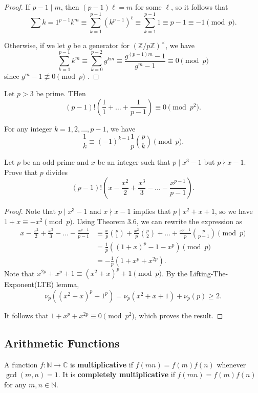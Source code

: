 \documentclass[11pt]{article}
\newcommand{\N}{\mathbb{N}}
\newcommand{\Z}{\mathbb{Z}}
\newcommand{\C}{\mathbb C}
\renewcommand{\>}{\rangle}
\newcommand{\<}{\langle}
\begin{document}
\begin{proof}
If $p-1 \mid m$, then $(p-1)\ell =m$ for some $\ell$, so it follows that 
$$\sum{k=1}^{p-1} k^m \equiv \sum_{k=1}^{p-1} (k^{p-1})^{\ell} \equiv \sum_{k=1}^{p-1} 1 \equiv p-1 \equiv -1 \pmod{p}.$$

Otherwise, if we let $g$ be a generator for $(\Z/p\Z)^\times$, we have 
$$\sum_{k=1}^{p-1} k^m \equiv \sum_{k=0}^{p-2} g^{km} \equiv \frac{g^{(p-1)m} - 1}{g^{m} - 1} \equiv 0 \pmod{p}$$
since $g^{m} -1 \not \equiv 0 \pmod{p}$ .
\end{proof}
\begin{theorem} Let $p > 3$ be prime.  THen
$$(p-1)! \left (\frac{1}{1} + \dots + \frac{1}{p-1} \right) \equiv 0 \pmod{p^2}.$$
\end{theorem}
\begin{theorem}
For any integer $k = 1, 2, \dots, p-1$, we have 
$$\frac{1}{k} \equiv (-1)^{k-1} \frac{1}{p} \binom{p}{k} \pmod{p}.$$
\end{theorem}

\begin{problem}[ELMO 2009] Let $p$ be an odd prime and $x$ be an integer such that $p \mid x^3 - 1$ but $p \nmid x-1$.  Prove that $p$ divides 
$$(p-1)! \left ( x - \frac{x^2}{2} + \frac{x^3}{3} - \dots - \frac{x^{p-1}}{p-1}\right).$$
\end{problem}
\begin{proof}
Note that $p \mid x^3 - 1$ and $x \nmid x-1$ implies that $p \mid x^2 + x + 1$, so we have $1 + x \equiv -x^2 \pmod{p}$.
Using Theorem $3.6$, we can rewrite the expression as 
\begin{align*}
x - \frac{x^2}{2} + \frac{x^3}{3} - \dots - \frac{x^{p-1}}{p-1} &\equiv \frac{x}{p} \binom{p}{1} + \frac{x^2}{p} \binom{p}{2} + \dots + \frac{x^{p-1}}{p} \binom{p}{p-1} \pmod{p} \\
&=  \frac{1}{p} \left ((1 + x)^p - 1 - x^p \right) \pmod{p} \\
&= -\frac{1}{p} \left (1 + x^p + x^{2p} \right).
\end{align*}
Note that $x^{2p} + x^p + 1 \equiv (x^2 + x)^p + 1 \pmod{p}$.  By the Lifting-The-Exponent(LTE) lemma, $$\nu_p((x^2 + x)^p + 1^p) = \nu_p (x^2 + x + 1) + \nu_p(p) \ge 2.$$

It follows that $1 + x^p + x^{2p} \equiv 0 \pmod{p^2}$, which proves the result.  
\end{proof}
\subsection{Arithmetic Functions}
\begin{definition} A function $f: \N \to \C$ is \textbf{multiplicative} if $f(mn) = f(m)f(n)$ whenever $\gcd(m, n) = 1$.  It is \textbf{completely multiplicative} if $f(mn) = f(m)f(n)$ for any $m, n \in \N$.
\end{definition}
\end{document}
